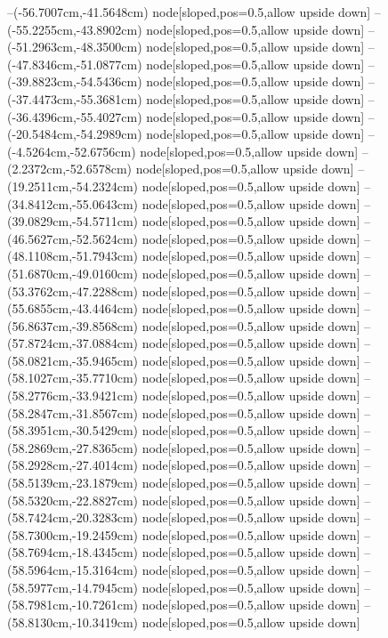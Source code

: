 --(-56.7007cm,-41.5648cm) node[sloped,pos=0.5,allow upside down]{\ArrowIn}
--(-55.2255cm,-43.8902cm) node[sloped,pos=0.5,allow upside down]{\ArrowIn}
--(-51.2963cm,-48.3500cm) node[sloped,pos=0.5,allow upside down]{\ArrowIn}
--(-47.8346cm,-51.0877cm) node[sloped,pos=0.5,allow upside down]{\ArrowIn}
--(-39.8823cm,-54.5436cm) node[sloped,pos=0.5,allow upside down]{\ArrowIn}
--(-37.4473cm,-55.3681cm) node[sloped,pos=0.5,allow upside down]{\ArrowIn}
--(-36.4396cm,-55.4027cm) node[sloped,pos=0.5,allow upside down]{\ArrowIn}
--(-20.5484cm,-54.2989cm) node[sloped,pos=0.5,allow upside down]{\ArrowIn}
--(-4.5264cm,-52.6756cm) node[sloped,pos=0.5,allow upside down]{\ArrowIn}
--(2.2372cm,-52.6578cm) node[sloped,pos=0.5,allow upside down]{\ArrowIn}
--(19.2511cm,-54.2324cm) node[sloped,pos=0.5,allow upside down]{\ArrowIn}
--(34.8412cm,-55.0643cm) node[sloped,pos=0.5,allow upside down]{\ArrowIn}
--(39.0829cm,-54.5711cm) node[sloped,pos=0.5,allow upside down]{\ArrowIn}
--(46.5627cm,-52.5624cm) node[sloped,pos=0.5,allow upside down]{\ArrowIn}
--(48.1108cm,-51.7943cm) node[sloped,pos=0.5,allow upside down]{\ArrowIn}
--(51.6870cm,-49.0160cm) node[sloped,pos=0.5,allow upside down]{\ArrowIn}
--(53.3762cm,-47.2288cm) node[sloped,pos=0.5,allow upside down]{\ArrowIn}
--(55.6855cm,-43.4464cm) node[sloped,pos=0.5,allow upside down]{\ArrowIn}
--(56.8637cm,-39.8568cm) node[sloped,pos=0.5,allow upside down]{\ArrowIn}
--(57.8724cm,-37.0884cm) node[sloped,pos=0.5,allow upside down]{\ArrowIn}
--(58.0821cm,-35.9465cm) node[sloped,pos=0.5,allow upside down]{\ArrowIn}
--(58.1027cm,-35.7710cm) node[sloped,pos=0.5,allow upside down]{\arrowIn}
--(58.2776cm,-33.9421cm) node[sloped,pos=0.5,allow upside down]{\ArrowIn}
--(58.2847cm,-31.8567cm) node[sloped,pos=0.5,allow upside down]{\ArrowIn}
--(58.3951cm,-30.5429cm) node[sloped,pos=0.5,allow upside down]{\ArrowIn}
--(58.2869cm,-27.8365cm) node[sloped,pos=0.5,allow upside down]{\ArrowIn}
--(58.2928cm,-27.4014cm) node[sloped,pos=0.5,allow upside down]{\arrowIn}
--(58.5139cm,-23.1879cm) node[sloped,pos=0.5,allow upside down]{\ArrowIn}
--(58.5320cm,-22.8827cm) node[sloped,pos=0.5,allow upside down]{\arrowIn}
--(58.7424cm,-20.3283cm) node[sloped,pos=0.5,allow upside down]{\ArrowIn}
--(58.7300cm,-19.2459cm) node[sloped,pos=0.5,allow upside down]{\ArrowIn}
--(58.7694cm,-18.4345cm) node[sloped,pos=0.5,allow upside down]{\arrowIn}
--(58.5964cm,-15.3164cm) node[sloped,pos=0.5,allow upside down]{\ArrowIn}
--(58.5977cm,-14.7945cm) node[sloped,pos=0.5,allow upside down]{\arrowIn}
--(58.7981cm,-10.7261cm) node[sloped,pos=0.5,allow upside down]{\ArrowIn}
--(58.8130cm,-10.3419cm) node[sloped,pos=0.5,allow upside down]{\arrowIn}
